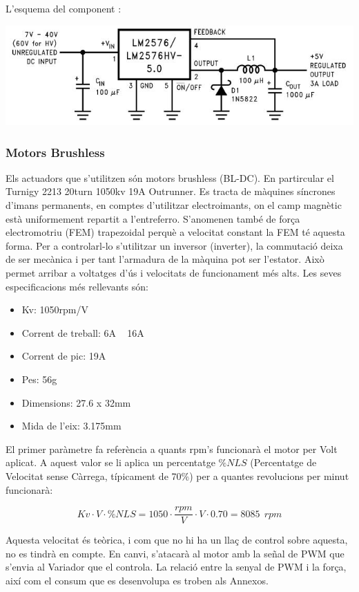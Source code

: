 \documentclass[twoside]{article}
\begin{document}
L'esquema del component \cite{lm2576s}:

\begin{center}
\includegraphics[scale=0.55]{images/lm2576s.jpeg} 
\end{center}

\subsubsection*{Motors Brushless}
Els actuadors que s'utilitzen són motors brushless (BL-DC). En partircular el Turnigy 2213 20turn 1050kv 19A Outrunner.
Es tracta de màquines síncrones d'imans permanents, en comptes d'utilitzar electroimants, on el camp magnètic està uniformement repartit a l'entreferro. S'anomenen també de força electromotriu (FEM) trapezoidal perquè a velocitat constant la FEM té aquesta forma. 
Per a controlarl-lo s'utilitzar un inversor (inverter), la commutació deixa de ser mecànica i per tant l'armadura de la màquina pot ser l'estator. Això permet arribar a voltatges d'ús i velocitats de funcionament més alts.
Les seves especificacions més rellevants són:
\begin{itemize}
\item Kv: 1050rpm/V
\item Corrent de treball: 6A ~ 16A
\item Corrent de pic: 19A
\item Pes: 56g
\item Dimensions: 27.6 x 32mm
\item Mida de l'eix: 3.175mm
\end{itemize}
El primer paràmetre fa referència a quants rpm's funcionarà el motor per Volt aplicat. A aquest valor se li aplica un percentatge $\%NLS$ (Percentatge de Velocitat sense Càrrega, típicament de 70\%) per a quantes revolucions per minut funcionarà:

\begin{equation}
Kv  \cdot V \cdot \%NLS = 1050 \cdot \frac{rpm}{V}\cdot V \cdot 0.70 = 8085 \>\> rpm
\end{equation}

Aquesta velocitat és teòrica, i com que no hi ha un llaç de control sobre aquesta, no es tindrà en compte. En canvi, s'atacarà al motor amb la señal de PWM que s'envia al Variador que el controla. La relació entre la senyal de PWM i la força, així com el consum que es desenvolupa es troben als Annexos. 
\end{document}
